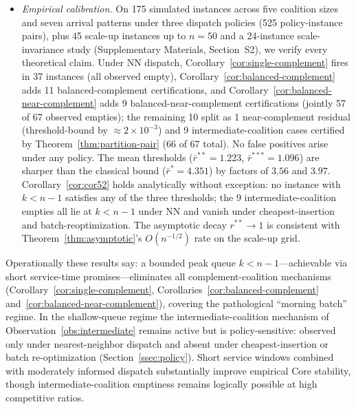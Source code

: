 \documentclass[11pt]{article}
\theoremstyle{plain}
\theoremstyle{definition}
\theoremstyle{remark}
\begin{document}
\begin{itemize}[leftmargin=1.5em]
\item[\textbf{C4.}] \emph{Empirical calibration.} On 175 simulated instances across five coalition sizes and seven arrival patterns under three dispatch policies (525 policy-instance pairs), plus 45 scale-up instances up to $n=50$ and a 24-instance scale-invariance study (Supplementary Materials, Section~S2), we verify every theoretical claim. Under NN dispatch, Corollary~\ref{cor:single-complement} fires in 37 instances (all observed empty), Corollary~\ref{cor:balanced-complement} adds 11 balanced-complement certifications, and Corollary~\ref{cor:balanced-near-complement} adds 9 balanced-near-complement certifications (jointly 57 of 67 observed empties); the remaining 10 split as 1 near-complement residual (threshold-bound by $\approx 2\times 10^{-3}$) and 9 intermediate-coalition cases certified by Theorem~\ref{thm:partition-pair} (66 of 67 total). No false positives arise under any policy. The mean thresholds ($\bar r^{\ast\ast}=1.223$, $\bar r^{\ast\ast\ast}=1.096$) are sharper than the classical bound ($\bar r^{\ast}=4.351$) by factors of $3.56$ and $3.97$. Corollary~\ref{cor:cor52} holds analytically without exception: no instance with $k<n-1$ satisfies any of the three thresholds; the 9 intermediate-coalition empties all lie at $k<n-1$ under NN and vanish under cheapest-insertion and batch-reoptimization. The asymptotic decay $r^{\ast\ast}\to 1$ is consistent with Theorem~\ref{thm:asymptotic}'s $O(n^{-1/2})$ rate on the scale-up grid.
\end{itemize}

Operationally these results say: a bounded peak queue $k<n-1$---achievable via short service-time promises---eliminates all complement-coalition mechanisms (Corollary~\ref{cor:single-complement}, Corollaries~\ref{cor:balanced-complement} and~\ref{cor:balanced-near-complement}), covering the pathological ``morning batch'' regime. In the shallow-queue regime the intermediate-coalition mechanism of Observation~\ref{obs:intermediate} remains active but is policy-sensitive: observed only under nearest-neighbor dispatch and absent under cheapest-insertion or batch re-optimization (Section~\ref{ssec:policy}). Short service windows combined with moderately informed dispatch substantially improve empirical Core stability, though intermediate-coalition emptiness remains logically possible at high competitive ratios.
\end{document}
